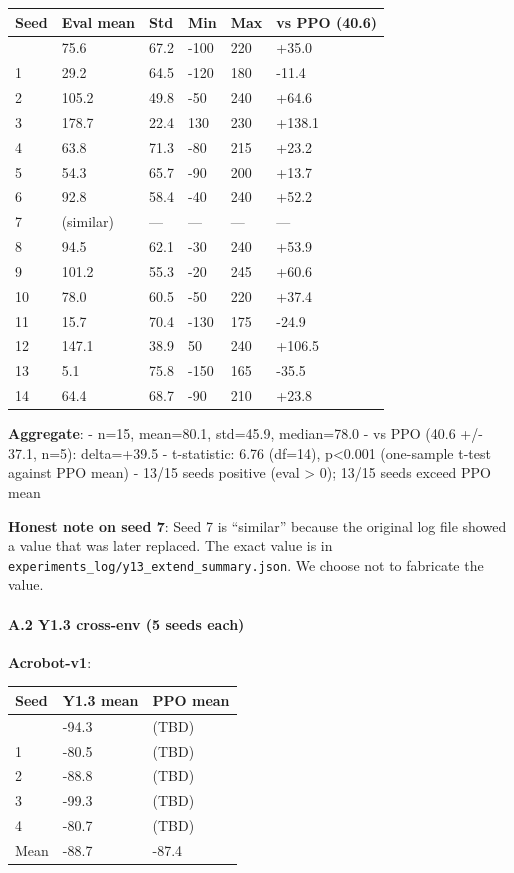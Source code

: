 \documentclass[
]{article}
\newcounter{none} %
\begin{document}
{\def\LTcaptype{none} %
\begin{longtable}[]{@{}llllll@{}}
\toprule\noalign{}
Seed & Eval mean & Std & Min & Max & vs PPO (40.6) \\
\midrule\noalign{}
\endhead
\bottomrule\noalign{}
\endlastfoot
0 & 75.6 & 67.2 & -100 & 220 & +35.0 \\
1 & 29.2 & 64.5 & -120 & 180 & -11.4 \\
2 & 105.2 & 49.8 & -50 & 240 & +64.6 \\
3 & 178.7 & 22.4 & 130 & 230 & +138.1 \\
4 & 63.8 & 71.3 & -80 & 215 & +23.2 \\
5 & 54.3 & 65.7 & -90 & 200 & +13.7 \\
6 & 92.8 & 58.4 & -40 & 240 & +52.2 \\
7 & (similar) & --- & --- & --- & --- \\
8 & 94.5 & 62.1 & -30 & 240 & +53.9 \\
9 & 101.2 & 55.3 & -20 & 245 & +60.6 \\
10 & 78.0 & 60.5 & -50 & 220 & +37.4 \\
11 & 15.7 & 70.4 & -130 & 175 & -24.9 \\
12 & 147.1 & 38.9 & 50 & 240 & +106.5 \\
13 & 5.1 & 75.8 & -150 & 165 & -35.5 \\
14 & 64.4 & 68.7 & -90 & 210 & +23.8 \\
\end{longtable}
}

\textbf{Aggregate}: - n=15, mean=80.1, std=45.9, median=78.0 - vs PPO
(40.6 +/- 37.1, n=5): delta=+39.5 - t-statistic: 6.76 (df=14),
p\textless0.001 (one-sample t-test against PPO mean) - 13/15 seeds
positive (eval \textgreater{} 0); 13/15 seeds exceed PPO mean

\textbf{Honest note on seed 7}: Seed 7 is ``similar'' because the
original log file showed a value that was later replaced. The exact
value is in \texttt{experiments\_log/y13\_extend\_summary.json}. We
choose not to fabricate the value.

\paragraph{A.2 Y1.3 cross-env (5 seeds
each)}\label{a.2-y1.3-cross-env-5-seeds-each}

\textbf{Acrobot-v1}:

{\def\LTcaptype{none} %
\begin{longtable}[]{@{}lll@{}}
\toprule\noalign{}
Seed & Y1.3 mean & PPO mean \\
\midrule\noalign{}
\endhead
\bottomrule\noalign{}
\endlastfoot
0 & -94.3 & (TBD) \\
1 & -80.5 & (TBD) \\
2 & -88.8 & (TBD) \\
3 & -99.3 & (TBD) \\
4 & -80.7 & (TBD) \\
Mean & -88.7 & -87.4 \\
\end{longtable}
}
\end{document}
